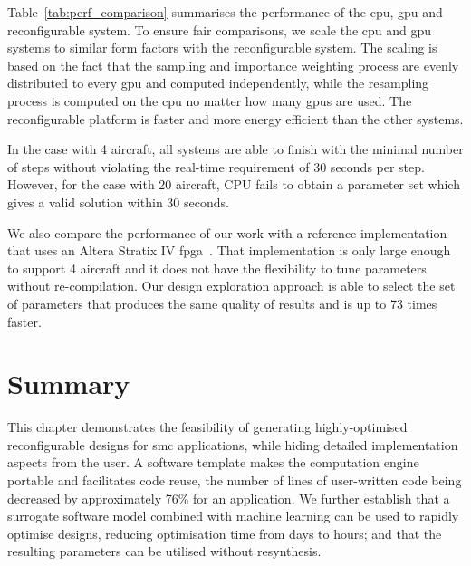 Table~\ref{tab:perf_comparison} summarises the performance of the \gls{cpu}, \gls{gpu} and reconfigurable system.
To ensure fair comparisons, we scale the \gls{cpu} and \gls{gpu} systems to similar form factors with the reconfigurable system.
The scaling is based on the fact that the sampling and importance weighting process are evenly distributed to every \gls{gpu} and computed independently,
while the resampling process is computed on the \gls{cpu} no matter how many \gls{gpu}s are used.
The reconfigurable platform is faster and more energy efficient than the other systems.

In the case with 4 aircraft, all systems are able to finish with the minimal number of steps without violating the real-time requirement of 30 seconds per step.
However, for the case with 20 aircraft, CPU fails to obtain a parameter set which gives a valid solution within 30 seconds.

We also compare the performance of our work with a reference implementation that uses an Altera Stratix IV \gls{fpga}~\cite{chau13acm}.
That implementation is only large enough to support 4 aircraft and it does not have the flexibility to tune parameters without re-compilation.
Our design exploration approach is able to select the set of parameters that produces the same quality of results and is up to 73 times faster.



\section{Summary}
\label{sec:flow_summary}

This chapter demonstrates the feasibility of generating highly-optimised reconfigurable designs for \gls{smc} applications, while hiding detailed implementation aspects from the user.  
A software template makes the computation engine portable and facilitates code reuse, the number of lines of user-written code being decreased by approximately 76\% for an application.
We further establish that a surrogate software model combined with machine learning can be used to rapidly optimise designs, reducing optimisation time from days to hours; 
and that the resulting parameters can be utilised without resynthesis. 

